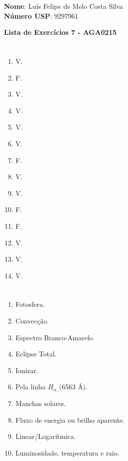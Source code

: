 \documentclass[12pt,letterpaper]{article}
\begin{document}
	
	\large \textbf{Nome}: Luís Felipe de Melo Costa Silva \\
	\textbf{Número USP}: 9297961 
    
	\begin{center}
		\LARGE \bf
		Lista de Exercícios 7 - AGA0215
	\end{center}
	
	\part{}
	
	\begin{multicols}{7}
		\begin{enumerate}
			\item V. %
			\item F. %
			\item V. %
			\item V. %
			\item V. %
			\item V. %
			\item F. %
			\item V. %
			\item V. %
			\item F. %
			\item F. %
			\item V. %
 		    \item V. %
		    \item V. %
		\end{enumerate}
	\end{multicols}
	
	\part{}
		\begin{multicols}{2}
			\begin{enumerate}
				\item Fotosfera. %
				\item Convecção. %
				\item Espectro Branco-Amarelo. %
				\item Eclipse Total. %
				\item Ionizar. %
				\item Pela  linha $H_\alpha$ (6563 {\AA}). %
				\item Manchas solares. %
				\item Fluxo de energia ou brilho aparente. %
				\item Linear/Logarítmica. %
				\item Luminosidade, temperatura e raio. %
			\end{enumerate}
		\end{multicols}
	
\end{document}
